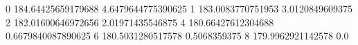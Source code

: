 0 184.64425659179688 4.6479644775390625
1 183.0083770751953 3.0120849609375
2 182.01600646972656 2.01971435546875
4 180.66427612304688 0.6679840087890625
6 180.5031280517578 0.5068359375
8 179.9962921142578 0.0
